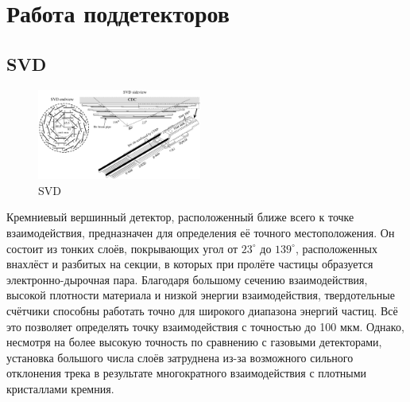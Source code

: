 \section{Работа поддетекторов}
\subsection{SVD}


\begin{figure}
    \centering
    \includegraphics[width=0.48\textwidth]{img/SVD.png}
    \caption{SVD}
    \label{the:SVD}
\end{figure}

Кремниевый вершинный детектор, расположенный ближе всего к точке взаимодействия, 
предназначен для определения её точного местоположения. 
Он состоит из тонких слоёв, покрывающих угол от $23^\circ$ до $139^\circ$, 
расположенных внахлёст и разбитых на секции, в которых при пролёте частицы 
образуется электронно-дырочная пара. Благодаря большому сечению взаимодействия, 
высокой плотности материала и низкой энергии взаимодействия, твердотельные 
счётчики способны работать точно для широкого диапазона энергий частиц.
Всё это позволяет определять точку взаимодействия с точностью до 100 мкм. 
Однако, несмотря на более высокую точность по сравнению с газовыми детекторами, 
установка большого числа слоёв затруднена из-за возможного сильного отклонения 
трека в результате многократного взаимодействия с плотными кристаллами кремния.



